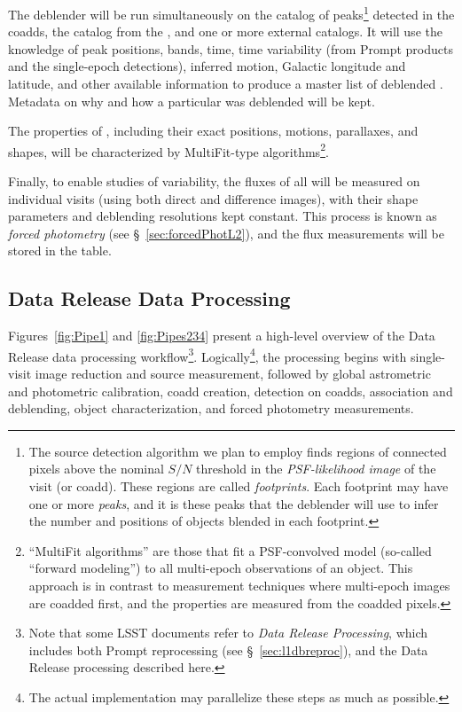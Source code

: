\documentclass[SE,lsstdraft,toc]{lsstdoc}
\begin{document}
The deblender will be run simultaneously on the catalog of peaks\footnote{The source detection algorithm we plan to employ finds regions of connected pixels above the nominal $S/N$ threshold in the \emph{PSF-likelihood image} of the visit (or coadd). These regions are called \emph{footprints}. Each footprint may have one or more \emph{peaks}, and it is these peaks that the deblender will use to infer the number and positions of objects blended in each footprint.} detected in the coadds, the \DIAObject catalog from the \DB, and one or more external catalogs.  It will use the knowledge of peak positions, bands, time, time variability (from Prompt products and the single-epoch \Source detections), inferred motion, Galactic longitude and latitude, and other available information to produce a master list of deblended \Objects. Metadata on why and how a particular \Object was deblended will be kept.

The properties of \Objects, including their exact positions, motions, parallaxes, and shapes, will be characterized by MultiFit-type algorithms\footnote{``MultiFit algorithms'' are those that fit a PSF-convolved model (so-called ``forward modeling'')  to all multi-epoch observations of an object. This approach is in contrast to measurement techniques where multi-epoch images are coadded first, and the properties are measured from the coadded pixels.}.

Finally, to enable studies of variability, the fluxes of all \Objects will be measured on individual visits (using both
direct and difference images), with their shape parameters and deblending resolutions kept constant. This process is known as \emph{forced photometry} (see \S~\ref{sec:forcedPhotL2}), and the flux measurements will be stored in the \ForcedSource table.

\subsection{Data Release Data Processing}
\label{sec:level2dp}


Figures~\ref{fig:Pipe1} and \ref{fig:Pipes234}
present a high-level overview of the Data Release data processing workflow\footnote{Note that some LSST documents refer to \emph{Data Release Processing}, which includes both Prompt reprocessing (see \S~\ref{sec:l1dbreproc}), and the Data Release processing described here.}. Logically\footnote{The actual implementation may parallelize these steps as much as possible.}, the processing begins with single-visit image reduction and source measurement, followed by global astrometric and photometric calibration, coadd creation, detection on coadds, association and deblending, object characterization, and forced photometry measurements.
\end{document}
